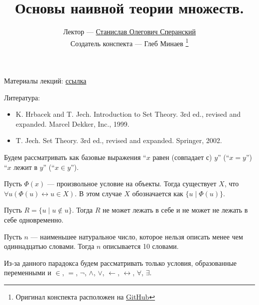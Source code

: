 \documentclass[12pt,a4paper]{article}
\title{Основы наивной теории множеств.}
\author{Лектор --- \href{https://users.math-cs.spbu.ru/~speranski}{Станислав Олегович Сперанский} \\
        Создатель конспекта --- Глеб Минаев
        \footnote{Оригинал конспекта расположен на \href{https://github.com/lounres/SPbU-MCS-2020-M-lecture-notes}{GitHub}}}
\date{}
\begin{document}
    \maketitle

    Материалы лекций: \href{https://users.math-cs.spbu.ru/~speranski/courses/sets-2020-autumn/materials.html}{ссылка}
    
    Литература:
    \begin{itemize}
        \item K. Hrbacek and T. Jech. Introduction to Set Theory. 3rd ed., revised and expanded. Marcel Dekker, Inc., 1999.
        \item T. Jech. Set Theory. 3rd ed., revised and expanded. Springer, 2002.
    \end{itemize}

    Будем рассматривать как базовые выражения ``$x$ равен (совпадает с) $y$'' (``$x=y$'') ``$x$ лежит в $y$'' (``$x\in y$'').

    \begin{definition}
        Пусть $\Phi(x)$ --- произвольное условие на объекты. Тогда существует $X$, что $\forall u (\Phi(u) \leftrightarrow u \in X)$. В этом случае $X$ обозначается как $\{u \mid \Phi(u)\}$.
    \end{definition}

    \begin{statement}
        Пусть $R = \{u \mid u \notin u\}$. Тогда $R$ не может лежать в себе и не может не лежать в себе одновременно.
    \end{statement}

    \begin{statement}
        Пусть $n$ --- наименьшее натуральное число, которое нельзя описать менее чем одиннадцатью словами. Тогда $n$ описывается 10 словами.
    \end{statement}

    Из-за данного парадокса будем рассматривать только условия, образованные переменными и $\in$, $=$, $\neg$, $\wedge$, $\vee$, $\leftarrow$, $\leftrightarrow$, $\forall$, $\exists$.
\end{document}
